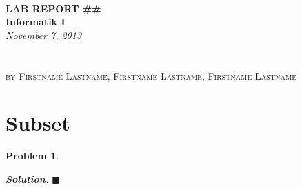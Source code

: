 \documentclass[12pt]{article}
\newtheorem{p}{Problem}[section]
\theoremstyle{definition}
\newenvironment{s}{%
        \begin{trivlist} \item \textbf{Solution}. }{%
            \hspace*{\fill} $\blacksquare$\end{trivlist}}%
\begin{document}
{\noindent\huge\bf  \\[0.5\baselineskip] {\selectfont  LAB REPORT \#\#}         }\\[\baselineskip]
{ 
    {\bf {}\selectfont Informatik I}
    \\ 
    {\textit{\selectfont     November 7, 2013}}}
    ~~~~~~~~~~~~~~~~~~~~~~~~~~~~~~~~~~~~~~~~~~~~~~~~~~~~~~~~~~~~~~~~~~~~~~~~~~~~~    
    \\{\small \textsc{by}}
    {\normalfont \textsc{Firstname Lastname, Firstname Lastname, Firstname Lastname}} %
\\[0\baselineskip] 

\section{Subset}
\begin{p} \lipsum[4]
    \begin{s}
        \lipsum[4]
    \end{s}
\end{p}
\end{document}

